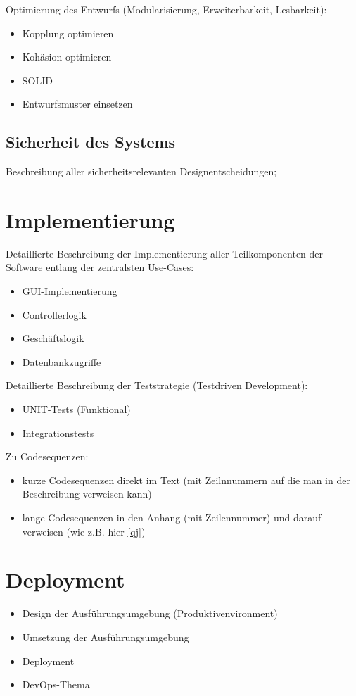 Optimierung des Entwurfs (Modularisierung, Erweiterbarkeit, Lesbarkeit):
\begin{itemize}
	\item Kopplung optimieren
	\item 	Kohäsion optimieren
	\item 	SOLID
	\item 	Entwurfsmuster einsetzen
\end{itemize}

\section{Sicherheit des Systems}
Beschreibung aller sicherheitsrelevanten Designentscheidungen;

\chapter{Implementierung}
Detaillierte Beschreibung der Implementierung aller Teilkomponenten der Software entlang der zentralsten Use-Cases:

\begin{itemize}
	\item GUI-Implementierung
	\item Controllerlogik
	\item Geschäftslogik
	\item Datenbankzugriffe
\end{itemize}

Detaillierte Beschreibung der Teststrategie (Testdriven Development):

\begin{itemize}
	\item UNIT-Tests (Funktional)
	\item Integrationstests
\end{itemize}

Zu Codesequenzen:
\begin{itemize}
	\item kurze Codesequenzen direkt im Text (mit Zeilnnummern auf die man in der Beschreibung verweisen kann)
	\item lange Codesequenzen in den Anhang (mit Zeilennummer) und darauf verweisen (wie z.B. hier \cref{qj})
\end{itemize}

\chapter{Deployment}
\begin{itemize}
	\item Design der Ausführungsumgebung (Produktivenvironment)
	\item Umsetzung der Ausführungsumgebung
	\item Deployment
	\item DevOps-Thema
\end{itemize}

